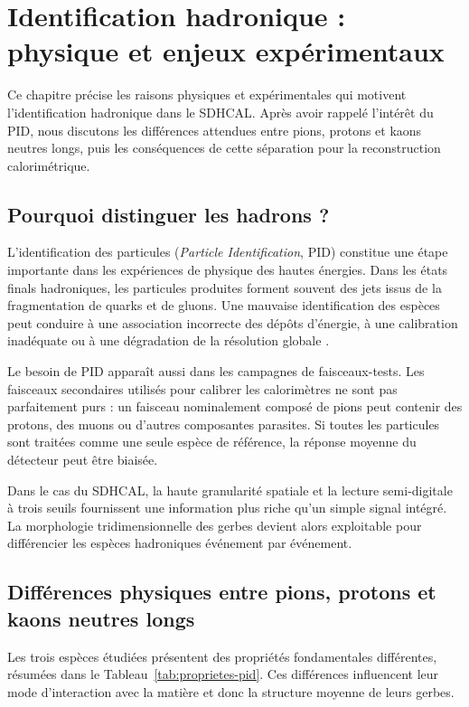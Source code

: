 \chapter{Identification hadronique : physique et enjeux expérimentaux}
\label{chap:pid_physique}

Ce chapitre précise les raisons physiques et expérimentales qui motivent l'identification hadronique dans le SDHCAL. Après avoir rappelé l'intérêt du PID, nous discutons les différences attendues entre pions, protons et kaons neutres longs, puis les conséquences de cette séparation pour la reconstruction calorimétrique.

\section{Pourquoi distinguer les hadrons ?}

L'identification des particules (\emph{Particle Identification}, PID) constitue une étape importante dans les expériences de physique des hautes énergies. Dans les états finals hadroniques, les particules produites forment souvent des jets issus de la fragmentation de quarks et de gluons. Une mauvaise identification des espèces peut conduire à une association incorrecte des dépôts d'énergie, à une calibration inadéquate ou à une dégradation de la résolution globale \cite{pdg2024}.

Le besoin de PID apparaît aussi dans les campagnes de faisceaux-tests. Les faisceaux secondaires utilisés pour calibrer les calorimètres ne sont pas parfaitement purs : un faisceau nominalement composé de pions peut contenir des protons, des muons ou d'autres composantes parasites. Si toutes les particules sont traitées comme une seule espèce de référence, la réponse moyenne du détecteur peut être biaisée.

Dans le cas du SDHCAL, la haute granularité spatiale et la lecture semi-digitale à trois seuils fournissent une information plus riche qu'un simple signal intégré. La morphologie tridimensionnelle des gerbes devient alors exploitable pour différencier les espèces hadroniques événement par événement.

\section{Différences physiques entre pions, protons et kaons neutres longs}
\label{sec:differences-physiques}

Les trois espèces étudiées présentent des propriétés fondamentales différentes, résumées dans le Tableau~\ref{tab:proprietes-pid}. Ces différences influencent leur mode d'interaction avec la matière et donc la structure moyenne de leurs gerbes.


